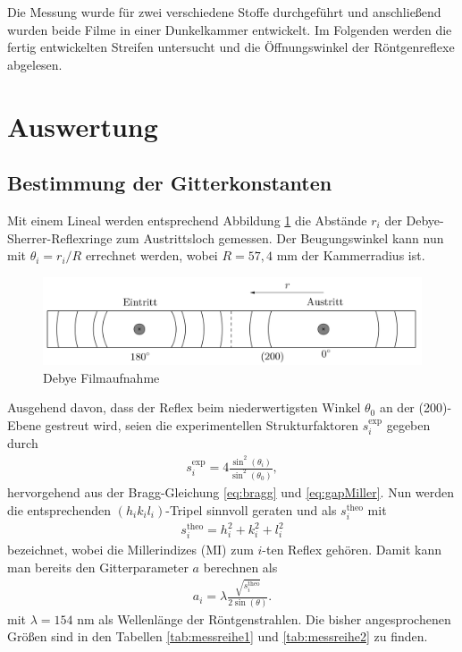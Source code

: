 Die Messung wurde für zwei verschiedene Stoffe durchgeführt und anschließend wurden beide Filme in einer Dunkelkammer entwickelt. Im Folgenden werden die fertig entwickelten Streifen untersucht und die Öffnungswinkel der Röntgenreflexe abgelesen.  

\section{Auswertung}
\subsection{Bestimmung der Gitterkonstanten}
Mit einem Lineal werden entsprechend Abbildung \ref{pic:debyefilm} die Abstände $r_i$ der Debye-Sherrer-Reflexringe zum Austrittsloch gemessen. Der 
Beugungswinkel kann nun mit $\theta_i = r_i/R$ errechnet werden, wobei $R=57,4$ mm der Kammerradius ist. 
\begin{figure}[H]
 \includegraphics[width=\textwidth]{../pics/debyestreifen.jpg}
 \caption{Debye Filmaufnahme}
 \label{pic:debyefilm}
\end{figure}
\noindent Ausgehend davon, dass der Reflex beim niederwertigsten
Winkel $\theta_0$ an der (200)-Ebene gestreut wird, seien die experimentellen Strukturfaktoren $s^\text{exp}_i$ gegeben durch
\begin{align}
 s^\text{exp}_i = 4\frac{\sin^2(\theta_i)}{\sin^2(\theta_0)},
 \label{eq:structExp}
\end{align}
hervorgehend aus der Bragg-Gleichung \eqref{eq:bragg} und \eqref{eq:gapMiller}. Nun werden die entsprechenden $(h_ik_il_i)$-Tripel sinnvoll geraten und als 
$s^\text{theo}_i$ mit
\begin{align}
 s^\text{theo}_i = h_i^2 + k_i^2 + l_i^2
 \label{eq:structTheo}
\end{align}
bezeichnet, wobei die Millerindizes (MI) zum $i$-ten Reflex gehören. Damit kann man bereits den Gitterparameter $a$ berechnen als
\begin{align}
 a_i = \lambda\frac{\sqrt{s^\text{theo}_i}}{2\sin(\theta)}.
 \label{eq:gitterparameter}
\end{align}
mit $\lambda=154$ nm als Wellenlänge der Röntgenstrahlen. Die bisher angesprochenen Größen sind in den Tabellen \ref{tab:messreihe1} und \ref{tab:messreihe2} zu finden.

